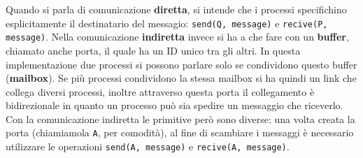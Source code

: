 Quando si parla di comunicazione \textbf{diretta}, si intende che i processi specifichino esplicitamente il destinatario del messagio: \texttt{send(Q, message)} e \texttt{recive(P, message)}. Nella comunicazione \textbf{indiretta} invece si ha a che fare con un \textbf{buffer}, chiamato anche porta, il quale ha un ID unico tra gli altri. In questa implementazione due processi si possono parlare solo se condividono questo buffer (\textbf{mailbox}). Se più processi condividono la stessa mailbox si ha quindi un link che collega diversi processi, inoltre attraverso questa porta il collegamento è bidirezionale in quanto un processo può sia spedire un messaggio che riceverlo. Con la comunicazione indiretta le primitive però sono diverse: una volta creata la porta (chiamiamola \texttt{A}, per comodità), al fine di scambiare i messaggi è necessario utilizzare le operazioni \texttt{send(A, message)} e \texttt{recive(A, message)}.
